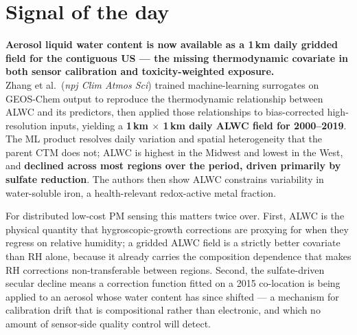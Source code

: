 \documentclass[10pt]{article}
\begin{document}
\vspace{6mm}

\section*{\sffamily\bfseries\color{Deep}Signal of the day}
\vspace{-1.5mm}{\color{Amber}\rule{\linewidth}{1.1pt}}\vspace{2.5mm}

\begin{keybox}
{\sffamily\bfseries\small\color{Deep}Aerosol liquid water content is now available as a
1\,km daily gridded field for the contiguous US --- the missing thermodynamic covariate
in both sensor calibration and toxicity-weighted exposure.}\\[1.4mm]
\footnotesize
Zhang et al.\ (\textit{npj Clim Atmos Sci}) trained machine-learning surrogates on
GEOS-Chem output to reproduce the thermodynamic relationship between ALWC and its
predictors, then applied those relationships to bias-corrected high-resolution inputs,
yielding a \textbf{1\,km $\times$ 1\,km daily ALWC field for 2000--2019}. The ML product
resolves daily variation and spatial heterogeneity that the parent CTM does not; ALWC is
highest in the Midwest and lowest in the West, and \textbf{declined across most regions
over the period, driven primarily by sulfate reduction}. The authors then show ALWC
constrains variability in water-soluble iron, a health-relevant redox-active metal
fraction.

For distributed low-cost PM sensing this matters twice over. First, ALWC is the physical
quantity that hygroscopic-growth corrections are proxying for when they regress on
relative humidity; a gridded ALWC field is a strictly better covariate than RH alone,
because it already carries the composition dependence that makes RH corrections
non-transferable between regions. Second, the sulfate-driven secular decline means a
correction function fitted on a 2015 co-location is being applied to an aerosol whose
water content has since shifted --- a mechanism for calibration drift that is
compositional rather than electronic, and which no amount of sensor-side quality control
will detect.
\end{keybox}

\vspace{3mm}

\end{document}
